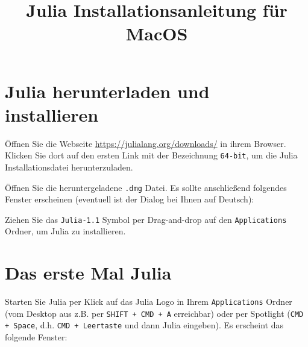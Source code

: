 \documentclass[11pt, a4paper]{scrartcl}
\title{Julia Installationsanleitung für MacOS}
\author{}
\date{}
\begin{document}
	\maketitle
	
	
	
	
	
	
	\section{Julia herunterladen und installieren}
	Öffnen Sie die Webseite \url{https://julialang.org/downloads/} in ihrem Browser. Klicken Sie dort auf den ersten Link mit der Bezeichnung \texttt{64-bit}, um die Julia Installationsdatei herunterzuladen.
	
	\begin{figure}[h!]
		\centering
	\end{figure}

	Öffnen Sie die heruntergeladene \texttt{.dmg} Datei. Es sollte anschließend folgendes Fenster erscheinen (eventuell ist der Dialog bei Ihnen auf Deutsch):

	Ziehen Sie das \texttt{Julia-1.1} Symbol per Drag-and-drop auf den \texttt{Applications} Ordner, um Julia zu installieren.
	
	
	
	
	
	
	
	
	
	
	
	
	
	
	
	
	\newpage
	\section{Das erste Mal Julia}
	Starten Sie Julia per Klick auf das Julia Logo in Ihrem \texttt{Applications} Ordner (vom Desktop aus z.B. per \texttt{SHIFT + CMD + A} erreichbar) oder per Spotlight (\texttt{CMD + Space}, d.h. \texttt{CMD + Leertaste} und dann Julia eingeben). Es erscheint das folgende Fenster:
	
\end{document}
